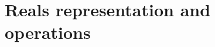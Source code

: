 \renewcommand{\home}{./Fortran/sources/IEEE} 




\chapter{Reals representation and operations} \label{chap:reals}


